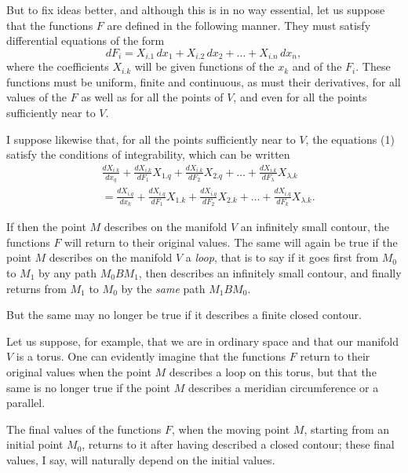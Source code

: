 \documentclass{article}
\begin{document}
But to fix ideas better, and although this is in no way essential, let us suppose that the functions $F$ are defined in the following manner. They must satisfy differential equations of the form
\[ dF_{i} = X_{i.1}\,dx_{1} + X_{i.2}\,dx_{2} + \ldots + X_{i.n}\,dx_{n}, \tag{1} \]
where the coefficients $X_{i.k}$ will be given functions of the $x_{k}$ and of the $F_{i}$. These functions must be uniform, finite and continuous, as must their derivatives, for all values of the $F$ as well as for all the points of $V$, and even for all the points sufficiently near to $V$.

I suppose likewise that, for all the points sufficiently near to $V$, the equations (1) satisfy the conditions of integrability, which
can be written
\[ \begin{aligned} &\frac{dX_{i.k}}{dx_{q}} + \frac{dX_{i.k}}{dF_{1}}X_{1.q} + \frac{dX_{i.k}}{dF_{2}}X_{2.q} + \ldots + \frac{dX_{i.k}}{dF_{\lambda}}X_{\lambda.k}\\ &= \frac{dX_{i.q}}{dx_{k}} + \frac{dX_{i.q}}{dF_{1}}X_{1.k} + \frac{dX_{i.q}}{dF_{2}}X_{2.k} + \ldots + \frac{dX_{i.q}}{dF_{k}}X_{\lambda.k}. \end{aligned} \]

If then the point $M$ describes on the manifold $V$ an infinitely small contour, the functions $F$ will return to their original values. The same will again be true if the point $M$ describes on the manifold $V$ a \emph{loop}, that is to say if it goes first from $M_{0}$ to $M_{1}$ by any path $M_{0}BM_{1}$, then describes an infinitely small contour, and finally returns from $M_{1}$ to $M_{0}$ by the \emph{same} path $M_{1}BM_{0}$.

But the same may no longer be true if it describes a finite closed contour.

Let us suppose, for example, that we are in ordinary space and that our manifold $V$ is a torus. One can evidently imagine that the functions $F$ return to their original values when the point $M$ describes a loop on this torus, but that the same is no longer true if the point $M$ describes a meridian circumference or a parallel.

The final values of the functions $F$, when the moving point $M$, starting from an initial point $M_{0}$, returns to it after having described a closed contour; these final values, I say, will naturally depend on the initial values.
\end{document}
